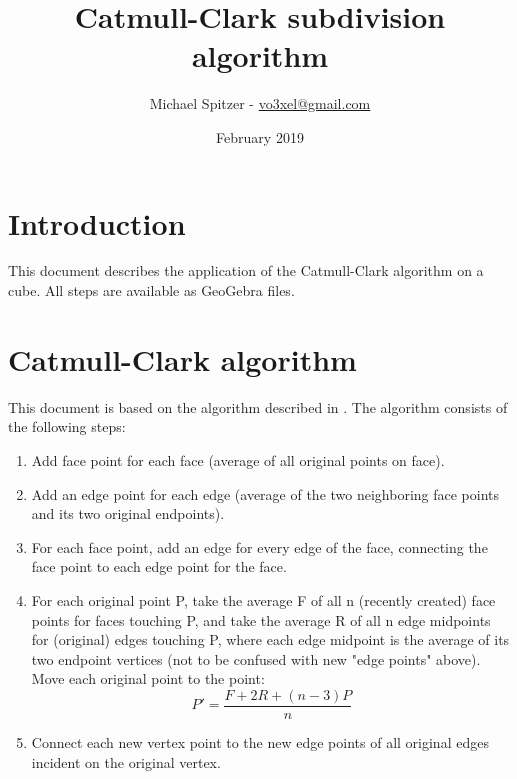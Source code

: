 \documentclass{article}
\title{Catmull-Clark subdivision algorithm}
\author{Michael Spitzer - \href{mailto:vo3xel@gmail.com}{vo3xel@gmail.com}}
\date{February 2019}
\begin{document}
\maketitle

\section{Introduction}
This document describes the application of the Catmull-Clark algorithm on a cube. All steps are available as GeoGebra files.

\section{Catmull-Clark algorithm}
This document is based on the algorithm described in \cite{catmull1978recursively}. The algorithm consists of the following steps:
    \begin{enumerate}
      \item Add face point for each face (average of all original points on face).
      \item Add an edge point for each edge (average of the two neighboring face points and its two original endpoints).
      \item For each face point, add an edge for every edge of the face, connecting the face point to each edge point for the face.
      \item For each original point P, take the average F of all n (recently created) face points for faces touching P, and take the average R of all n edge midpoints for (original) edges touching P, where each edge midpoint is the average of its two endpoint vertices (not to be confused with new "edge points" above). Move each original point to the point:\[P'=\frac{F+2R+(n-3)P}{n}\]
      \item Connect each new vertex point to the new edge points of all original edges incident on the original vertex.
    \end{enumerate}
\end{document}
